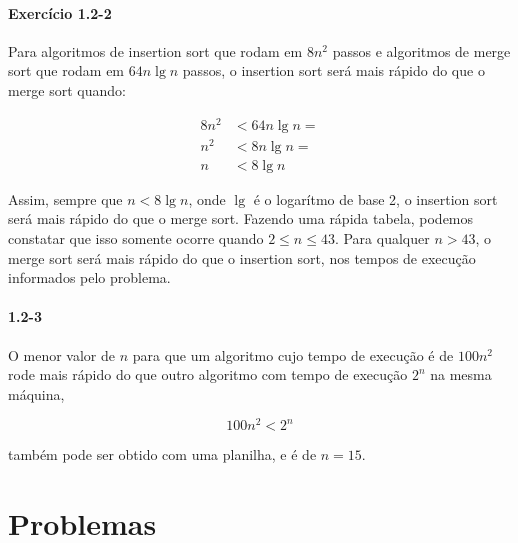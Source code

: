 \documentclass[pdftex,a4paper,12pt,brazil]{article} %
\begin{document}
\paragraph{Exercício 1.2-2}

Para algoritmos de insertion sort que rodam em $8n^2$ passos e algoritmos de merge sort
que rodam em $64n \lg n$ passos, o insertion sort será mais rápido do que o merge sort quando:

\begin{equation}
  \begin{split}
  8n^2 & < 64n \lg n =\\
  n^2 & < 8n \lg n =\\
  n &< 8 \lg n
  \end{split}
\end{equation}

Assim, sempre que $n < 8 \lg n$, onde $\lg$ é o logarítmo de base 2, o insertion sort será
mais rápido do que o merge sort. Fazendo uma rápida tabela, podemos constatar que isso somente
ocorre quando $2 \le n \le 43$. Para qualquer $n > 43$, o merge sort será mais rápido do que
o insertion sort, nos tempos de execução informados pelo problema.

\paragraph{1.2-3}

O menor valor de $n$ para que um algoritmo cujo tempo de execução é de $100n^2$ rode mais
rápido do que outro algoritmo com tempo de execução $2^n$ na mesma máquina,

\begin{equation}
  100n^2 < 2^n
\end{equation}

\noindent também pode ser obtido com uma planilha, e é de $n = 15$.

\section{Problemas}
\label{problemas}
\end{document}
